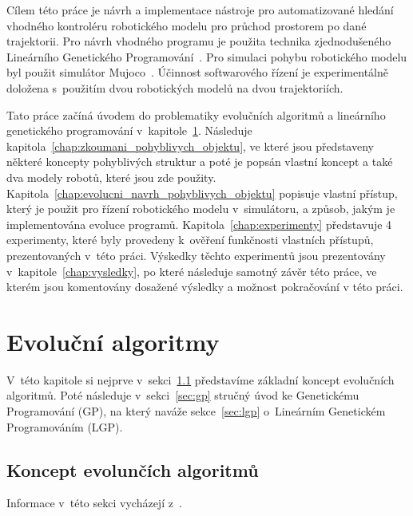 Cílem této práce je návrh a implementace nástroje pro automatizované hledání vhodného kontroléru robotického modelu pro průchod prostorem po dané trajektorii.
Pro návrh vhodného programu je použita technika zjednodušeného Lineárního Genetického Programování~\cite{Brameier2010}.
Pro simulaci pohybu robotického modelu byl použit simulátor Mujoco~\cite{Todorov2012}.
Účinnost softwarového řízení je experimentálně doložena s~použitím dvou robotických modelů na dvou trajektoriích.

Tato práce začíná úvodem do problematiky evolučních algoritmů a lineárního genetického programování v~kapitole~\ref{chap:evolucni_algoritmy}.
Následuje kapitola~\ref{chap:zkoumani_pohyblivych_objektu}, ve které jsou představeny některé koncepty pohyblivých struktur a poté je popsán vlastní koncept a také dva modely robotů, které jsou zde použity.
Kapitola~\ref{chap:evolucni_navrh_pohyblivych_objektu} popisuje vlastní přístup, který je použit pro řízení robotického modelu v~simulátoru, a způsob, jakým je implementována evoluce programů.
Kapitola~\ref{chap:experimenty} představuje 4 experimenty, které byly provedeny k~ověření funkčnosti vlastních přístupů, prezentovaných v~této práci.
Výskedky těchto experimentů jsou prezentovány v~kapitole~\ref{chap:vysledky}, po které následuje samotný závěr této práce, ve kterém jsou komentovány dosažené výsledky a možnost pokračování v této práci.


\chapter{Evoluční algoritmy}
\label{chap:evolucni_algoritmy}

V~této kapitole si nejprve v~sekci~\ref{sec:koncept_ea} představíme základní koncept evolučních algoritmů.
Poté následuje v~sekci~\ref{sec:gp} stručný úvod ke Genetickému Programování (GP), na který naváže sekce~\ref{sec:lgp} o~Lineárním Genetickém Programováním (LGP).

\section{Koncept evolunčích algoritmů}
\label{sec:koncept_ea}
Informace v~této sekci vycházejí z~\cite{Eiben2015}.

